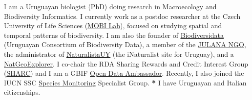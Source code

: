\documentclass[9pt]{developercv} %
\begin{document}


I am a Uruguayan biologist (PhD) doing research in Macroecology and Biodiversity Informatics. I currently work as a postdoc researcher at the Czech University of Life Sciences (\href{https://petrkeil.github.io/}{\underline{MOBI Lab}}), focused on studying spatial and temporal patterns of biodiversity. I am also the founder of \href{https://biodiversidata.org/}{\underline{Biodiversidata}} (Uruguayan Consortium of Biodiversity Data), a member of the \href{https://julana.org/}{\underline{JULANA NGO}}, the administrator of \href{https://www.naturalista.uy/}{\underline{NaturalistaUY}} (the iNaturalist site for Uruguay), and a \href{https://www.nationalgeographic.org/find-explorers/ED0031R000029s0gjQAA}{\underline{NatGeoExplorer}}. I co-chair the RDA Sharing Rewards and Credit Interest Group  (\href{https://www.rd-alliance.org/groups/sharing-rewards-and-credit-sharc-ig}{\underline{SHARC}})  and I am a GBIF \href{https://www.gbif.org/article/1ye7qAa9Z2HVSn85bfSmLP/who-are-the-gbif-biodiversity-open-data-ambassadors}{\underline{Open Data Ambassador}}. Recently, I also joined the IUCN SSC \href{http://www.speciesmonitoring.orgn/}{\underline{Species Monitoring}} Specialist Group. {\textbf{*}}  I have Uruguayan and Italian citizenships. \\\

\end{document}

